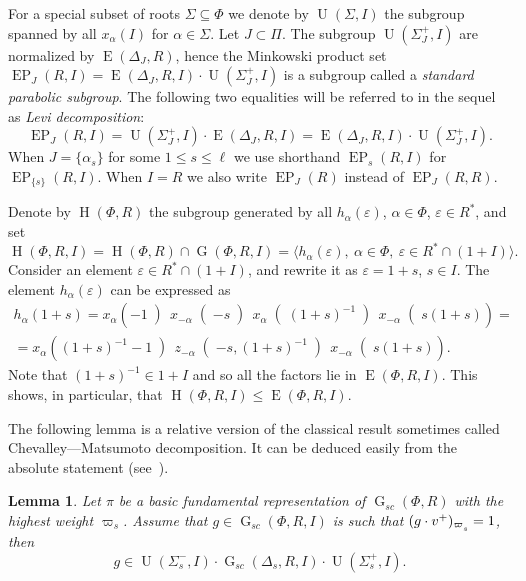 \documentclass[12pt]{amsart}
\theoremstyle{plain}
\numberwithin{equation}{section}
\newtheorem{lemma}{Lemma}
\numberwithin{lemma}{section}
\theoremstyle{definition}
\theoremstyle{remark}
\DeclareMathOperator{\G}{G}
\DeclareMathOperator{\E}{E}
\DeclareMathOperator{\EP}{EP}
\DeclareMathOperator{\Hh}{H}
\DeclareMathOperator{\U}{U}
\def\ssub#1{\mathchoice
   {_{\lower2pt\hbox{$\scriptstyle #1$}}}
   {_{\lower2pt\hbox{$\scriptstyle #1$}}}
   {_{\lower1.5pt\hbox{$\scriptscriptstyle #1$}}}
   {_{\!\lower1.5pt\hbox{$\scriptscriptstyle #1$}}}}
\begin{document}
For a special subset of roots $\Sigma\subseteq \Phi$ we denote by $\U(\Sigma, I)$ the subgroup spanned by all $x_{\alpha}(I)$ for $\alpha\in \Sigma$. Let $J\subset\Pi$.
The subgroup $\U(\Sigma_J^+, I)$ are normalized by $\E(\Delta_J, R)$, hence the Minkowski product set $\EP_J(R, I) = \E(\Delta_J, R, I) \cdot \U(\Sigma_J^+, I)$ is a subgroup called a \emph{standard parabolic subgroup}.
The following two equalities will be referred to in the sequel as {\it Levi decomposition}: 
\begin{equation} \label{rel:Levi-decomp} \EP_J(R, I) = \U(\Sigma_J^+, I) \cdot \E(\Delta_J, R, I) = \E(\Delta_J, R, I) \cdot \U(\Sigma_J^+, I). \end{equation}
When $J = \{ \alpha_s \}$ for some $1 \leq s\leq \ell$ we use shorthand $\EP_s(R, I)$ for $\EP_{\{s\}}(R, I)$.
When $I=R$ we also write $\EP_J(R)$ instead of $\EP_J(R, R)$.

Denote by $\Hh(\Phi, R)$ the subgroup generated by all $h_\alpha(\varepsilon)$, $\alpha\in\Phi$, $\varepsilon\in R^*$, and set
\[ \Hh(\Phi, R, I) = \Hh(\Phi, R)\cap\G(\Phi, R, I)=\langle h_\alpha(\varepsilon), \ \alpha\in\Phi, \ \varepsilon\in R^*\cap(1+I)\rangle. \]
Consider an element $\varepsilon\in R^*\cap(1+I)$, and rewrite it as $\varepsilon=1+s$, $s\in I$. The element $h_\alpha(\varepsilon)$ can be expressed as
\begin{multline} \label{eq:rel-tor-elementary}
h_\alpha(1+s) = x_\alpha\left(-1\middle)\, x_{-\alpha}\middle(-s\middle)\, x_\alpha\middle((1+s)^{-1}\middle)\, x_{-\alpha}\middle(s(1+s)\right) = \\
= x_\alpha\left((1+s)^{-1}-1\middle)\, z_{-\alpha}\middle(-s, (1+s)^{-1}\middle)\, x_{-\alpha}\middle(s(1+s)\right).
\end{multline}
Note that $(1+s)^{-1}\in 1+I$ and so all the factors lie in $\E(\Phi, R, I)$. This shows, in particular, that $\Hh(\Phi, R, I) \leqslant \E(\Phi, R, I)$.

The following lemma is a relative version of the classical result sometimes called Chevalley---Matsumoto decomposition.
It can be deduced easily from the absolute statement (see~\cite[Theorem~1.3]{St78}).
\begin{lemma}\label{lemma:Chevalley-Matsumoto}
Let $\pi$ be a basic fundamental representation of $\G_{sc}(\Phi, R)$ with the highest weight $\varpi_s$.
Assume that $g\in \G_{sc}(\Phi, R, I)$ is such that $(g\cdot v^+)_{\varpi\ssub{s}}=1$, then 
\[ g \in \U(\Sigma_s^-, I) \cdot \G_{sc}(\Delta_s, R, I) \cdot \U(\Sigma_s^+, I). \]
\end{lemma}
\end{document}
